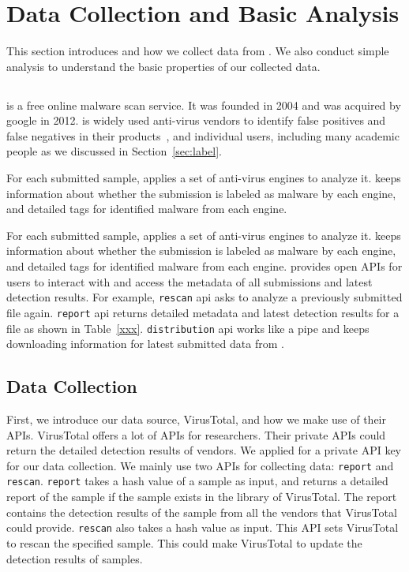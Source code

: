 \section{Data Collection and Basic Analysis}
\label{sec:data}

This section introduces \vt{} and how we collect data from \vt{}. 
We also conduct simple analysis to understand 
the basic properties of our collected data. 

\subsection{\vt{}}
\vt{} is a free online malware scan service. 
It was founded in 2004 and was acquired by google in 2012. 
\vt{} is widely used anti-virus vendors to identify false positives and false negatives 
in their products~\cite{huangvt2016bigdata, neeles}, 
and individual users, including many academic people 
as we discussed in Section~\ref{sec:label}.

For each submitted sample, \vt applies a set of anti-virus engines to analyze it. 
\vt{} keeps information about whether the submission is labeled as malware by each engine, 
and detailed tags for identified malware from each engine. 

For each submitted sample, \vt applies a set of anti-virus engines to analyze it. 
\vt{} keeps information about whether the submission is labeled as malware by each engine, 
and detailed tags for identified malware from each engine. 
\vt{} provides open APIs for users to interact with \vt{} 
and access the metadata of all submissions and latest detection results.
For example, \texttt{rescan} api asks \vt{} to analyze a previously submitted file again. 
\texttt{report} api returns detailed metadata and latest detection results for a file as shown in Table~\ref{xxx}. 
\texttt{distribution} api works like a pipe and keeps 
downloading information for latest submitted data from \vt{}. 



\subsection{Data Collection}

First, we introduce our data source, VirusTotal, and how we make use of their APIs. VirusTotal offers a lot of APIs for researchers. Their private APIs could return the detailed detection results of vendors. We applied for a private API key for our data collection. We mainly use two APIs for collecting data: \texttt{report} and \texttt{rescan}. \texttt{report} takes a hash value of a sample as input, and returns a detailed report of the sample if the sample exists in the library of VirusTotal. The report contains the detection results of the sample from all the vendors that VirusTotal could provide. \texttt{rescan} also takes a hash value as input. This API sets VirusTotal to rescan the specified sample. This could make VirusTotal to update the detection results of samples.


